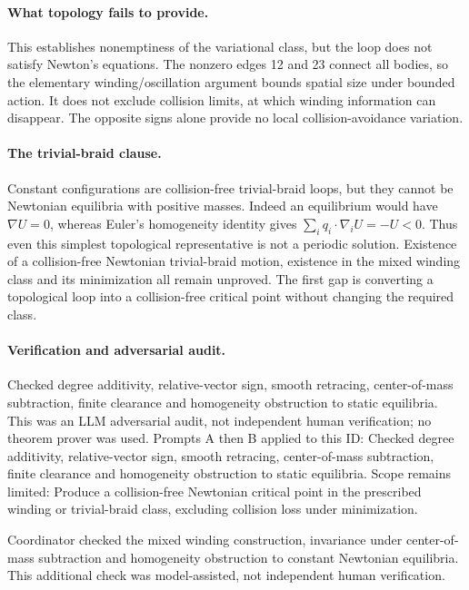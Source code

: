 \documentclass[11pt]{article}
\begin{document}
\paragraph{What topology fails to provide.}This establishes nonemptiness of the variational class, but the loop does not satisfy Newton's equations. The nonzero edges 12 and 23 connect all bodies, so the elementary winding/oscillation argument bounds spatial size under bounded action. It does not exclude collision limits, at which winding information can disappear. The opposite signs alone provide no local collision-avoidance variation.
\paragraph{The trivial-braid clause.}Constant configurations are collision-free trivial-braid loops, but they cannot be Newtonian equilibria with positive masses. Indeed an equilibrium would have \(\nabla U=0\), whereas Euler's homogeneity identity gives \(\sum_iq_i\cdot\nabla_iU=-U<0\). Thus even this simplest topological representative is not a periodic solution. Existence of a collision-free Newtonian trivial-braid motion, existence in the mixed winding class and its minimization all remain unproved. The first gap is converting a topological loop into a collision-free critical point without changing the required class.

\paragraph{Verification and adversarial audit.}
Checked degree additivity, relative-vector sign, smooth retracing, center-of-mass subtraction, finite clearance and homogeneity obstruction to static equilibria. This was an LLM adversarial audit, not independent human verification; no theorem prover was used. Prompts A then B applied to this ID: Checked degree additivity, relative-vector sign, smooth retracing, center-of-mass subtraction, finite clearance and homogeneity obstruction to static equilibria. Scope remains limited: Produce a collision-free Newtonian critical point in the prescribed winding or trivial-braid class, excluding collision loss under minimization.

Coordinator checked the mixed winding construction, invariance under center-of-mass subtraction and homogeneity obstruction to constant Newtonian equilibria. This additional check was model-assisted, not independent human verification.
\end{document}
